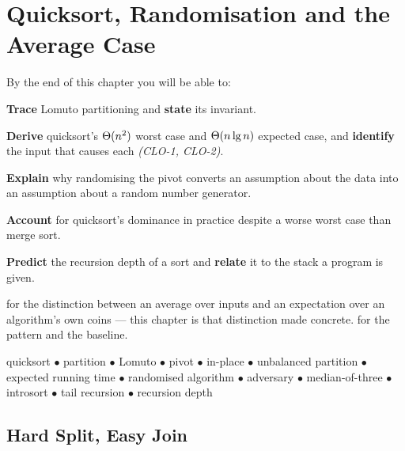 \chapter{Quicksort, Randomisation and the Average Case}\label{ch:quicksort}

\begin{outcomes}
By the end of this chapter you will be able to:
\begin{tight}
  \item \textbf{Trace} Lomuto partitioning and \textbf{state} its invariant.
  \item \textbf{Derive} quicksort's $\Theta(n^{2})$ worst case and
        $\Theta(n\operatorname{lg} n)$ expected case, and \textbf{identify} the input that
        causes each \emph{(CLO-1, CLO-2)}.
  \item \textbf{Explain} why randomising the pivot converts an assumption about
        the data into an assumption about a random number generator.
  \item \textbf{Account} for quicksort's dominance in practice despite a worse
        worst case than merge sort.
  \item \textbf{Predict} the recursion depth of a sort and \textbf{relate} it
        to the stack a program is given.
\end{tight}
\end{outcomes}

\begin{prereq}
 for the distinction between an average over inputs and an
expectation over an algorithm's own coins --- this chapter is that distinction
made concrete.  for the pattern and the baseline.
\end{prereq}

\begin{keyterms}
quicksort $\bullet$ partition $\bullet$ Lomuto $\bullet$ pivot $\bullet$
in-place $\bullet$ unbalanced partition $\bullet$ expected running time
$\bullet$ randomised algorithm $\bullet$ adversary $\bullet$ median-of-three
$\bullet$ introsort $\bullet$ tail recursion $\bullet$ recursion depth
\end{keyterms}

\section{Hard Split, Easy Join}

